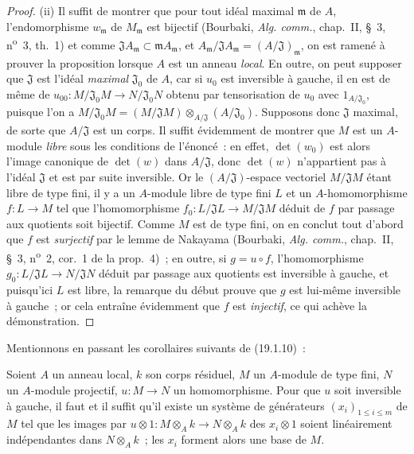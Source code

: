 \begin{proof}
(ii) Il suffit de montrer que pour tout idéal maximal $\mathfrak m$ de $A$,
l'endomorphisme $w_{\mathfrak m}$ de $M_{\mathfrak m}$ est bijectif
(Bourbaki, \emph{Alg. comm.}, chap.~II, §~3, n\textsuperscript{o}~3, th.~1)
et comme $\mathfrak JA_{\mathfrak m}\subset\mathfrak mA_{\mathfrak m}$, et
$A_{\mathfrak m}/\mathfrak JA_{\mathfrak m}=(A/\mathfrak J)_{\mathfrak m}$,
on est ramené à prouver la proposition lorsque $A$ est un anneau \emph{local}. En
outre, on peut supposer que $\mathfrak J$ est l'idéal \emph{maximal}
$\mathfrak J_0$ de $A$, car si $u_0$ est inversible
à gauche, il en est de même de
$u_{00}:M/\mathfrak J_0M\to N/\mathfrak J_0N$ obtenu par tensorisation de
$u_0$ avec $1_{A/\mathfrak J_0}$, puisque l'on a
$M/\mathfrak J_0M=(M/\mathfrak JM)\otimes_{A/\mathfrak J}(A/\mathfrak J_0)$.
Supposons donc $\mathfrak J$ maximal, de sorte que $A/\mathfrak J$ est un
corps. Il suffit évidemment de montrer que $M$ est un $A$-module \emph{libre}
sous les conditions de l'énoncé~: en effet, $\det(w_0)$ est alors l'image
canonique de $\det(w)$ dans $A/\mathfrak J$, donc $\det(w)$ n'appartient pas à
l'idéal $\mathfrak J$ et est par suite inversible. Or le
$(A/\mathfrak J)$-espace vectoriel $M/\mathfrak JM$ étant libre de type fini,
il y a un $A$-module libre de type fini $L$ et un $A$-homomorphisme $f:L\to M$ tel
que l'homomorphisme $f_0:L/\mathfrak JL\to M/\mathfrak JM$ déduit de $f$ par
passage aux quotients soit bijectif. Comme $M$ est de type fini, on en conclut
tout d'abord que $f$ est \emph{surjectif} par le lemme de Nakayama (Bourbaki,
\emph{Alg. comm.}, chap.~II, §~3, n\textsuperscript{o}~2, cor.~1 de la
prop.~4)~; en outre, si $g=u\circ f$, l'homomorphisme
$g_0:L/\mathfrak JL\to N/\mathfrak JN$ déduit par passage aux quotients est
inversible à gauche, et puisqu'ici $L$ est libre, la remarque du début prouve
que $g$ est lui-même inversible à gauche~; or cela entraîne évidemment que
$f$ est \emph{injectif}, ce qui achève la démonstration.
\end{proof}

Mentionnons en passant les corollaires suivants de (19.1.10)~:

\begin{corollary}[19.1.11]
\label{0.19.1.11-fr}
Soient $A$ un anneau local, $k$ son corps résiduel, $M$ un $A$-module de type
fini, $N$ un $A$-module projectif, $u:M\to N$ un homomorphisme. Pour que $u$
soit inversible à gauche, il faut et il suffit qu'il existe un système de
générateurs $(x_i)_{1\leq i\leq m}$ de $M$ tel que les images par
$u\otimes 1:M\otimes_Ak\to N\otimes_Ak$ des $x_i\otimes1$ soient linéairement
indépendantes dans $N\otimes_Ak$~; les $x_i$ forment alors une base de $M$.
\end{corollary}


